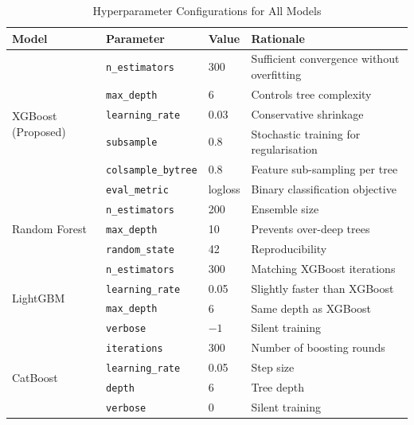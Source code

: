\begin{table}[!t]
  \renewcommand{\arraystretch}{1.25}
  \caption{Hyperparameter Configurations for All Models}
  \label{tab:hyperparams}
  \centering
  \begin{tabular}{llll}
    \hline
    \textbf{Model} & \textbf{Parameter} & \textbf{Value} & \textbf{Rationale} \\
    \hline
    \multirow{6}{*}{XGBoost (Proposed)}
      & \texttt{n\_estimators}    & 300            & Sufficient convergence without overfitting \\
      & \texttt{max\_depth}       & 6              & Controls tree complexity \\
      & \texttt{learning\_rate}   & 0.03           & Conservative shrinkage \\
      & \texttt{subsample}        & 0.8            & Stochastic training for regularisation \\
      & \texttt{colsample\_bytree}& 0.8            & Feature sub-sampling per tree \\
      & \texttt{eval\_metric}     & logloss        & Binary classification objective \\
    \hline
    \multirow{3}{*}{Random Forest}
      & \texttt{n\_estimators}    & 200            & Ensemble size \\
      & \texttt{max\_depth}       & 10             & Prevents over-deep trees \\
      & \texttt{random\_state}    & 42             & Reproducibility \\
    \hline
    \multirow{4}{*}{LightGBM}
      & \texttt{n\_estimators}    & 300            & Matching XGBoost iterations \\
      & \texttt{learning\_rate}   & 0.05           & Slightly faster than XGBoost \\
      & \texttt{max\_depth}       & 6              & Same depth as XGBoost \\
      & \texttt{verbose}          & $-1$           & Silent training \\
    \hline
    \multirow{4}{*}{CatBoost}
      & \texttt{iterations}       & 300            & Number of boosting rounds \\
      & \texttt{learning\_rate}   & 0.05           & Step size \\
      & \texttt{depth}            & 6              & Tree depth \\
      & \texttt{verbose}          & 0              & Silent training \\

\end{tabular}
\end{table}
